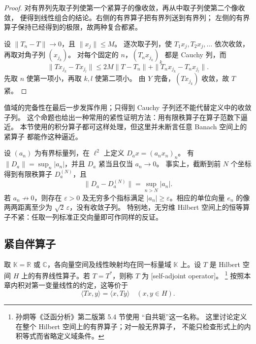\begin{proof}
对有界列先取子列使第一个紧算子的像收敛，再从中取子列使第二个像收敛，
便得到线性组合的结论。右侧的有界算子把有界列送到有界列；
左侧的有界算子保持已经得到的极限，故两种复合都紧。

设 \(\|T_n-T\|\to0\)，且 \(\|x_j\|\leq M\)。
逐次取子列，使 \(T_1x_j,T_2x_j,\ldots\) 依次收敛，再取对角子列 \((x_{j_k})\)。
对每个固定的 \(n\)，\((T_nx_{j_k})_k\) 都是 Cauchy 列，而
\[
 \|Tx_{j_k}-Tx_{j_l}\|
 \leq 2M\|T-T_n\|+\|T_nx_{j_k}-T_nx_{j_l}\|.
\]
先取 \(n\) 使第一项小，再取 \(k,l\) 使第二项小。
由 \(Y\) 完备，\((Tx_{j_k})\) 收敛，故 \(T\) 紧。
\end{proof}

值域的完备性在最后一步发挥作用；只得到 Cauchy 子列还不能代替定义中的收敛子列。
这个命题也给出一种常用的紧性证明方法：用有限秩算子在算子范数下逼近。
本节使用的积分算子都可这样处理，但这里并未断言任意 Banach 空间上的紧算子
都能作这种逼近。

\ProseParagraphBreak

设 \((a_n)\) 为有界标量列，在 \(\ell^2\) 上定义 \(D_ax=(a_nx_n)_n\)。
有 \(\|D_a\|=\sup_n|a_n|\)，并且 \(D_a\) 紧当且仅当 \(a_n\to0\)。
事实上，截断到前 \(N\) 个坐标得到有限秩算子 \(D_a^{(N)}\)，且
\[
 \|D_a-D_a^{(N)}\|=\sup_{n>N}|a_n|.
\]
若 \(a_n\not\to0\)，则存在 \(\varepsilon>0\) 及无穷多个指标满足%
\(|a_n|\geq\varepsilon\)。相应的单位向量 \(e_n\) 的像两两距离至少为%
\(\sqrt2\,\varepsilon\)，没有收敛子列。
特别地，无穷维 Hilbert 空间上的恒等算子不紧：任取一列标准正交向量即可作同样的反证。

\subsection{紧自伴算子}
\label{b1:subsec:080502}

\begin{definition}[自伴算子]
\label{b1:def:self-adjoint-operator}
取 \(\mathbb K=\mathbb R\) 或 \(\mathbb C\)，各向量空间及线性映射均在同一标量域 \(\mathbb K\) 上。设 \(T\) 是 Hilbert 空间 \(H\) 上的有界线性算子。若 \(T=T^*\)，则称 \(T\) 为%
[self-adjoint operator]。%
\footnote{孙炯等《泛函分析》第二版\cite{Sun2018Fanhan}第 5.4 节使用
“自共轭”这一名称。
这里讨论定义在整个 Hilbert 空间上的有界算子；对一般无界算子，
不能只检查形式上的内积等式而省略定义域条件。}%
按照本章内积对第一变量线性的约定，这等价于
\[
 \langle Tx,y\rangle=\langle x,Ty\rangle\quad(x,y\in H).
\]
\end{definition}

